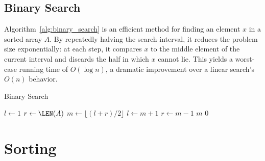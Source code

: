 \subsection{Binary Search}
\label{subsec:binary_search}



Algorithm~\ref{alg:binary_search} is an efficient method for finding an element \(x\) in a sorted array \(A\). 
By repeatedly halving the search interval, it reduces the problem size exponentially: at each step, it compares \(x\) to the middle element of the current interval and discards the half in which \(x\) cannot lie. 
This yields a worst-case running time of \(O(\log n)\), a dramatic improvement over a linear search's \(O(n)\) behavior.


\begin{algorithm}[htb]
    \caption{Binary Search}
    \label{alg:binary_search}
    \begin{algorithmic}[1]
            \State $l \gets 1$ 
            \State $r \gets \LEN(A)$ 
                \State $m \gets \lfloor (l + r) / 2 \rfloor$ 
                    \State $l \gets m + 1$ 
                    \State $r \gets m - 1$ 
                \Else
                    \State \Return $m$ 
                \EndIf
            \EndWhile
            \State \Return $0$ 
        \EndFunction
    \end{algorithmic}
\end{algorithm}


\section{Sorting}


